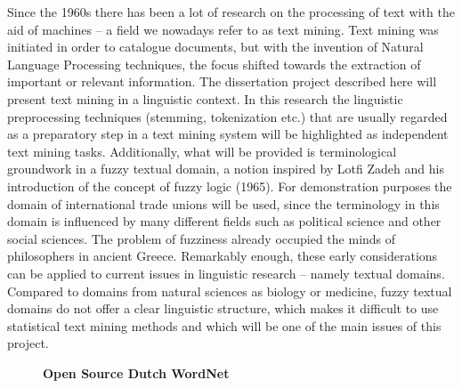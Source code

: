 \documentclass[10pt, a4paper, twopage, headinclude, footinclude, BCOR5mm]{book}
\begin{document}
\begin{table}[t!]
\end{table} 
\noindent
Since the 1960s there has been a lot of research on the processing of text with the aid of machines – a field we nowadays refer to as text mining. Text mining was initiated in order to catalogue documents, but with the invention of Natural Language Processing techniques, the focus shifted towards the extraction of important or relevant information.  The dissertation project described here will present text mining in a linguistic context. In this research the linguistic preprocessing techniques (stemming, tokenization etc.) that are usually regarded as a preparatory step in a text mining system will be highlighted as independent text mining tasks. Additionally, what will be provided is terminological groundwork in a fuzzy textual domain, a notion inspired by Lotfi Zadeh and his introduction of the concept of fuzzy logic (1965). For demonstration purposes the domain of international trade unions will be used, since the terminology in this domain is influenced by many different fields such as political science and other social sciences. The problem of fuzziness already occupied the minds of philosophers in ancient Greece. Remarkably enough, these early considerations can be applied to current issues in linguistic research – namely textual domains. Compared to domains from natural sciences as biology or medicine, fuzzy textual domains do not offer a clear linguistic structure, which makes it difficult to use statistical text mining methods and which will be one of the main issues of this project.   

\newpage

\begin{figure}[t!]
\centering
\large\textbf{Open Source Dutch WordNet}
\vspace*{0.5cm}
\end{figure}
\end{document}
